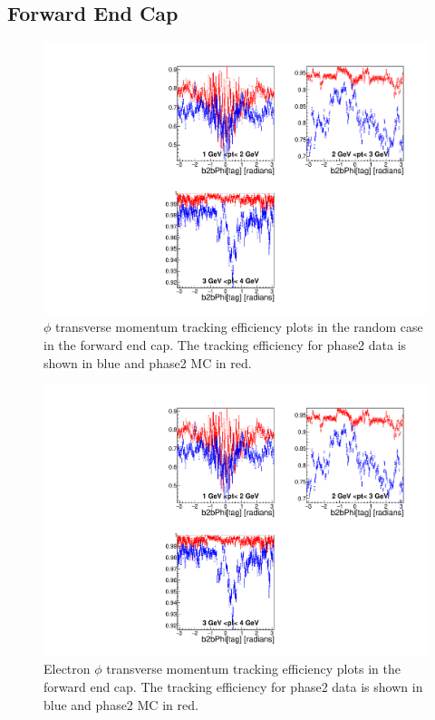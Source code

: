 \documentclass[a4paper,11pt,twosided,final,german,openbib,pdftex,listof=totoc,bibliography=totoc]{scrbook}
\begin{document}
\subsection{Forward End Cap}

\begin{figure}[!htbp]
	\centering
	\includegraphics[width=\textwidth]{Plots/master/xPtMPhiRandomFC}
	\caption[Transverse Momentum $\phi$ Random Forward End Cap Efficiency Phase2]{$\phi$ transverse momentum tracking efficiency plots in the random case in the forward end cap. The tracking efficiency for phase2 data is shown in blue and phase2 MC in red.}
\end{figure}



\begin{figure}[!htbp]
	\centering
	\includegraphics[width=\textwidth]{Plots/master/xPtMPhiemFC}
	\caption[Transverse Momentum $\phi$ Electron Forward End Cap Efficiency Phase2]{Electron $\phi$ transverse momentum tracking efficiency plots in the forward end cap. The tracking efficiency for phase2 data is shown in blue and phase2 MC in red.}
\end{figure}
\end{document}
